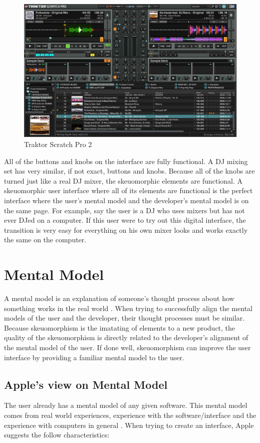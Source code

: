 \documentclass{article}
\begin{document}
\begin{figure}[H]
\centering
\includegraphics[width=4.5in]{traktorUI.jpg} 

\caption{Traktor Scratch Pro 2}
\label{traktor}
\end{figure}

All of the buttons and knobs on the interface are fully functional.  A DJ mixing set has very similar, if not exact, buttons and knobs.  Because all of the knobs are turned just like a real DJ mixer, the skeuomorphic elements are functional.  A skeuomorphic user interface where all of its elements are functional is the perfect interface where the user's mental model and the developer's mental model is on the same page.  For example, say the user is a DJ who uses mixers but has not ever DJed on a computer.  If this user were to try out this digital interface, the transition is very easy for everything on his own mixer looks and works exactly the same on the computer.

\section{Mental Model}

A mental model is an explanation of someone's thought process about how something works in the real world \cite{wiki-mental}.  When trying to successfully align the mental models of the user and the developer, their thought processes must be similar.  Because skeuomorphism is the imatating of elements to a new product, the quality of the skeuomorphism is directly related to the developer's alignment of the mental model of the user.  If done well, skeuomorphism can improve the user interface by providing a familiar mental model to the user.

\subsection{Apple's view on Mental Model}
The user already has a mental model of any given software.  This mental model comes from real world experiences, experience with the software/interface and the experience with computers in general \cite{apple}.  When trying to create an interface, Apple suggests the follow characteristics:
\end{document}
